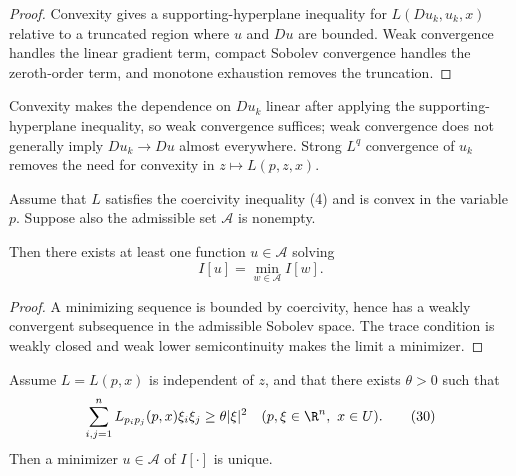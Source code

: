\begin{proof}
\sketch Convexity gives a supporting-hyperplane inequality for $L(Du_k,u_k,x)$ relative to a truncated region where $u$ and $Du$ are bounded. Weak convergence handles the linear gradient term, compact Sobolev convergence handles the zeroth-order term, and monotone exhaustion removes the truncation.
\end{proof}

\begin{remark}
\label{rem:weak-lower-semicontinuity-proof-remark}
Convexity makes the dependence on $Du_k$ linear after applying the supporting-hyperplane inequality, so weak convergence suffices; weak convergence does not generally imply $Du_k\to Du$ almost everywhere. Strong $L^q$ convergence of $u_k$ removes the need for convexity in $z\mapsto L(p,z,x)$.
\end{remark}

\begin{theorem}
\label{thm:existence-minimizer-convex-coercive}
Assume that $L$ satisfies the coercivity inequality (4) and is convex in the variable $p$. Suppose also the admissible set $\mathcal{A}$ is nonempty.

Then there exists at least one function $u \in \mathcal{A}$ solving
\[
I[u] = \min_{w \in \mathcal{A}} I[w] .
\]
\end{theorem}

\begin{proof}
\sketch A minimizing sequence is bounded by coercivity, hence has a weakly convergent subsequence in the admissible Sobolev space. The trace condition is weakly closed and weak lower semicontinuity makes the limit a minimizer.
\end{proof}

\begin{theorem}
\label{thm:uniqueness-minimizer-uniformly-convex}
Assume $L=L(p,x)$ is independent of $z$, and that there exists $\theta>0$ such that
\[
\sum_{i,j=1}^n L_{p_i p_j}(p,x)\xi_i\xi_j
\geq \theta|\xi|^2
\quad (p,\xi\in\R^n,\ x\in U).
\tag{30}
\]
Then a minimizer $u \in \mathcal{A}$ of $I[\cdot]$ is unique.
\end{theorem}

